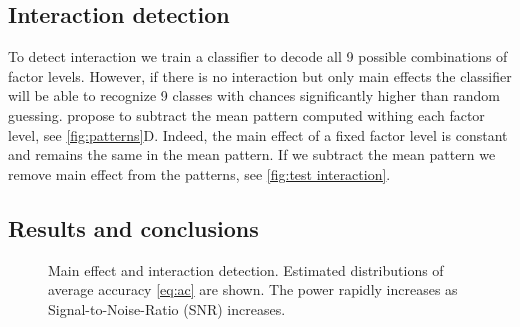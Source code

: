 \subsection{Interaction detection}

To detect interaction  we train a classifier to decode all 9 possible combinations of factor levels. However, if there is no interaction but only main effects the classifier will be able to recognize 9 classes with chances significantly higher than random guessing. \cite{Kornysheva2014} propose to subtract the mean pattern computed withing each factor level, see \autoref{fig:patterns}D. Indeed, the main effect of a fixed factor level is constant and remains the same in the mean pattern. If we subtract the mean pattern we remove main effect from the patterns, see \autoref{fig:test interaction}.

\subsection{Results and conclusions}

\begin{figure}[t]
\hfill
{}
\caption{Main effect and interaction detection. Estimated distributions of average accuracy \eqref{eq:ac} are shown. The power rapidly increases as Signal-to-Noise-Ratio (SNR) increases.}
\label{fig:knn2 convergence}
\end{figure}

